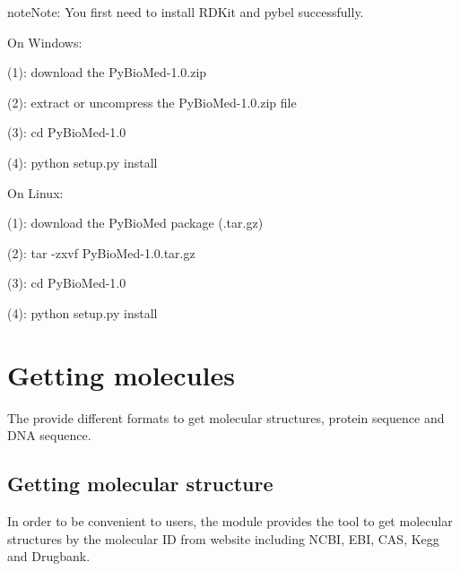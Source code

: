 \documentclass[letterpaper,10pt,english]{sphinxmanual}
\begin{document}
\begin{notice}{note}{Note:}
You first need to install RDKit and pybel successfully.
\end{notice}

On Windows:

(1): download the PyBioMed-1.0.zip

(2): extract or uncompress the PyBioMed-1.0.zip file

(3): cd PyBioMed-1.0

(4): python setup.py install

On Linux:

(1): download the PyBioMed package (.tar.gz)

(2): tar -zxvf PyBioMed-1.0.tar.gz

(3): cd PyBioMed-1.0

(4): python setup.py install


\section{Getting molecules}
\label{User_guide:getting-molecules}
The  provide different formats to get molecular structures, protein sequence and DNA sequence.


\subsection{Getting molecular structure}
\label{User_guide:getting-molecular-structure}
In order to be convenient to users, the {\hyperref[reference/Getmol:module\string-Getmol]{}} module provides the tool to get molecular structures by the molecular ID from website including NCBI, EBI, CAS, Kegg and Drugbank.
\end{document}
